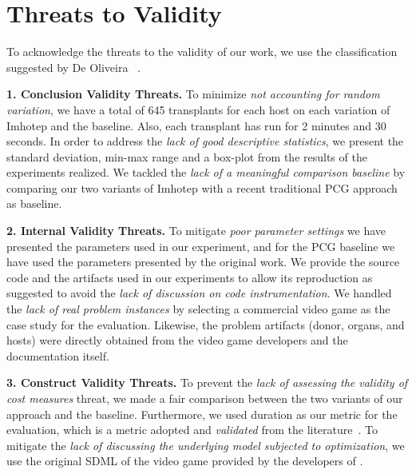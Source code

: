 \section{Threats to Validity}
\label{sec:Threats}

To acknowledge the threats to the validity of our work, we use the classification suggested by De Oliveira \etal~\cite{oliveira2011threats}.

\textbf{1. Conclusion Validity Threats.}
To minimize \textit{not accounting for random variation}, we have a total of 645 transplants for each host on each variation of Imhotep and the baseline. Also, each transplant has run for 2 minutes and 30 seconds.
In order to address the \textit{lack of good descriptive statistics}, we present the standard deviation, min-max range and a box-plot from the results of the experiments realized.
We tackled the \textit{lack of a meaningful comparison baseline} by comparing our two variants of Imhotep with a recent traditional PCG approach as baseline. 


\textbf{2. Internal Validity Threats.}
To mitigate \textit{poor parameter settings} we have presented the parameters used in our experiment, and for the PCG baseline we have used the parameters presented by the original work.
We provide the source code and the artifacts used in our experiments to allow its reproduction as suggested to avoid the \textit{lack of discussion on code instrumentation}.
We handled the \textit{lack of real problem instances} by selecting a commercial video game as the case study for the evaluation. Likewise, the problem artifacts (donor, organs, and hosts) were directly obtained from the video game developers and the documentation itself. 


\textbf{3. Construct Validity Threats.}
To prevent the \textit{lack of assessing the validity of cost measures} threat, we made a fair comparison between the two variants of our approach and the baseline. Furthermore, we used duration as our metric for the evaluation, which is a metric adopted and \textit{validated} from the literature~\cite{browne2010evolutionary}.
To mitigate the \textit{lack of discussing the underlying model subjected to optimization}, we use the original SDML of the video game provided by the developers of \CaseStudy{}.


